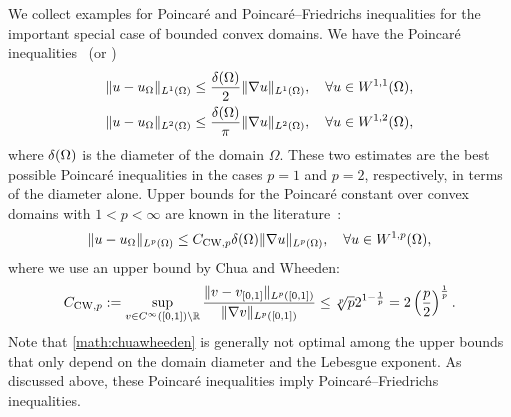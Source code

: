 \documentclass[10pt,a4paper]{article}
\begin{document}
We collect examples for Poincar\'e and Poincar\'e--Friedrichs inequalities for the important special case of bounded convex domains. 
We have the Poincar\'e inequalities~\cite{Pay_Wei_Poin_conv_60,bebendorf2003note,acosta2004optimal} (or \cite[Lemma~3.24]{ern2021finite}) 
\begin{align}\label{math:acostaduran}
    \| u - u_{\Omega} \|_{L^{1}(\Omega)}
    \leq 
    \frac{{\delta}(\Omega)}{2}
    \| \nabla u \|_{L^{1}(\Omega)}
    ,
    \quad 
    \forall 
    u \in W^{1,1}(\Omega)
    ,
    \\
    \| u - u_{\Omega} \|_{L^{2}(\Omega)} \label{math:bebendorf}
    \leq 
    \frac{{\delta}(\Omega)}{\pi}
    \| \nabla u \|_{L^{2}(\Omega)}
    ,
    \quad 
    \forall 
    u \in W^{1,2}(\Omega)
    ,
\end{align}
where ${\delta}(\Omega)$ is the diameter of the domain $\Omega$.
These two estimates are the best possible Poincar\'e inequalities in the cases $p=1$ and $p=2$, respectively, in terms of the diameter alone. 
Upper bounds for the Poincar\'e constant over convex domains with $1 < p < \infty$ are known in the literature~\cite[Theorem~1.1, Theorem~1.2]{chua2006estimates}:
\begin{align}\label{math:chuawheeden}
    \| u - u_{\Omega} \|_{L^{p}(\Omega)}
    \leq 
    C_{{\rm CW},p}
    {\delta}(\Omega)
    \| \nabla u \|_{L^{p}(\Omega)}
    ,
    \quad 
    \forall 
    u \in W^{1,p}(\Omega)
    ,
\end{align}
where we use an upper bound by Chua and Wheeden:
\begin{align*}
    C_{{\rm CW},p} 
    := 
    \sup\limits_{ v \in C^\infty([0,1]) \setminus {\mathbb R} } 
    \frac{ 
        \| v - v_{[0,1]} \|_{L^{p}([0,1])} 
    }{ 
        \| \nabla v \|_{L^{p}([0,1])} 
    }
    \leq 
    \sqrt[p]{p} 2^{1-\frac 1 p}
    =
    2
    \left( \frac p 2 \right)^{\frac 1 p}
    .
\end{align*} 
Note that \eqref{math:chuawheeden} is generally not optimal among the upper bounds that only depend on the domain diameter and the Lebesgue exponent.
As discussed above, these Poincar\'e inequalities imply Poincar\'e--Friedrichs inequalities. 
\end{document}

